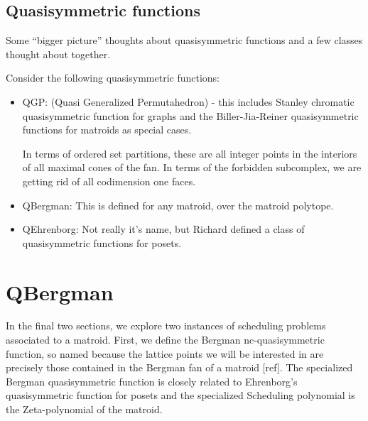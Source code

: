 \documentclass[12pt,reqno]{amsart}
\numberwithin{definition}{section}
\begin{document}
\subsection{Quasisymmetric functions}

Some ``bigger picture'' thoughts about quasisymmetric functions and a few classes thought about together. 

Consider the following quasisymmetric functions:

\begin{itemize}
\item QGP: (Quasi Generalized Permutahedron) - this includes Stanley chromatic quasisymmetric function for graphs and the Biller-Jia-Reiner quasisymmetric functions for matroids as special cases.

In terms of ordered set partitions, these are all integer points in the interiors of all maximal cones of the fan.  In terms of the forbidden subcomplex, we are getting rid of all codimension one faces.  

\item QBergman: This is defined for any matroid, over the matroid polytope.

\item QEhrenborg: Not really it's name, but Richard defined a class of quasisymmetric functions for posets.

\end{itemize}

\section{QBergman}

In the final two sections, we explore two instances of scheduling
problems associated to a matroid.  First, we define the Bergman
nc-quasisymmetric function, so named because the lattice points we will be
interested in are precisely those contained in the Bergman fan of a
matroid [ref].  The specialized Bergman quasisymmetric function is
closely related to Ehrenborg's quasisymmetric function for posets and
the specialized Scheduling polynomial is the Zeta-polynomial of the
matroid.



\end{document}
